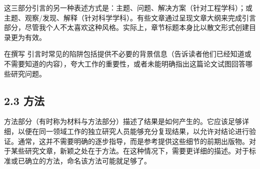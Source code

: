 这三部分引言的另一种表述方式是：主题、问题、解决方案（针对工程学科）；或主题、观察/发现、解释（针对科学学科）。有些文章通过呈现文章大纲来完成引言部分，尽管我个人不太喜欢这种风格。实际上，章节标题本身比以散文形式创建目录更为有效。

在撰写 引言时常见的陷阱包括提供不必要的背景信息（告诉读者他们已经知道或不需要知道的内容），夸大工作的重要性，或者未能明确指出这篇论文试图回答哪些研究问题。

\subsection*{2.3 方法}
方法部分（有时称为材料与方法部分）描述了结果是如何产生的。它应该足够详细，以便在同一领域工作的独立研究人员能够充分复现结果，以允许对结论进行验证。通常，这并不需要明确的逐步指导，而是参考提供这些细节的前期出版物。对于某些研究文章，新颖之处在于方法。在这种情况下，需要更详细的描述。对于标准或已确立的方法，命名该方法可能就足够了。

